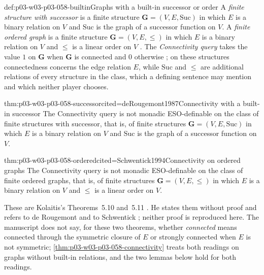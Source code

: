 \begin{hbconvention}{def:p03-w03-p03-058-builtin}{Graphs with a built-in successor or order}
A \emph{finite structure with successor} is a finite structure
\(\mathbf G=(V,E,\mathrm{Suc})\) in which \(E\) is a binary relation on
\(V\) and \(\mathrm{Suc}\) is the graph of a successor function on \(V\).
A \emph{finite ordered graph} is a finite structure
\(\mathbf G=(V,E,\le)\) in which \(E\) is a binary relation on \(V\) and
\(\le\) is a linear order on \(V\)
\cite[p.~29 and p.~4]{Kolaitis2003ExpressivePowerNotes}. The
\emph{Connectivity query} takes the value \(1\) on \(\mathbf G\) when
\(\mathbf G\) is connected and \(0\) otherwise
\cite[Example~2.2, pp.~4--5]{Kolaitis2003ExpressivePowerNotes}; on these
structures connectedness concerns the edge relation \(E\), while
\(\mathrm{Suc}\) and \(\le\) are additional relations of every structure in
the class, which a defining sentence may mention and which neither player
chooses.
\end{hbconvention}

\begin{hbtheorem}{thm:p03-w03-p03-058-successor}{cited=deRougemont1987}{Connectivity with a built-in successor}
The Connectivity query is not monadic ESO-definable on the class of finite
structures with successor, that is, of finite structures
\(\mathbf G=(V,E,\mathrm{Suc})\) in which \(E\) is a binary relation on
\(V\) and \(\mathrm{Suc}\) is the graph of a successor function on \(V\).
\end{hbtheorem}

\begin{hbtheorem}{thm:p03-w03-p03-058-ordered}{cited=Schwentick1994}{Connectivity on ordered graphs}
The Connectivity query is not monadic ESO-definable on the class of finite
ordered graphs, that is, of finite structures \(\mathbf G=(V,E,\le)\) in
which \(E\) is a binary relation on \(V\) and \(\le\) is a linear order on
\(V\).
\end{hbtheorem}

These are Kolaitis's Theorems~5.10 and~5.11
\cite[p.~29]{Kolaitis2003ExpressivePowerNotes}. He states them without
proof and refers to de Rougemont \cite{deRougemont1987} and to Schwentick
\cite{Schwentick1994}; neither proof is reproduced here. The manuscript does
not say, for these two theorems, whether \emph{connected} means connected
through the symmetric closure of \(E\) or strongly connected when \(E\) is
not symmetric; \cref{thm:p03-w03-p03-058-connectivity} treats both
readings on graphs without built-in relations, and the two lemmas below
hold for both readings.

